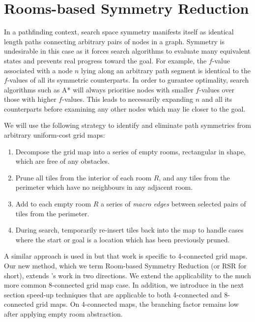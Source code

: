 \section{Rooms-based Symmetry Reduction}
In a pathfinding context, search space symmetry manifests itself as identical
length paths connecting arbitrary pairs of nodes in a graph. 
Symmetry is undesirable in this case as it forces search algorithms to evaluate 
many equivalent states and prevents real progress toward the goal.
For example, the $f$-value associated with a node $n$ lying along an arbitrary
 path segment is identical to the $f$-values of all its symmetric counterparts.
In order to gurantee optimality, search algorithms such as A* will always prioritise
nodes with smaller $f$-values over those with higher $f$-values. This leads to
necessarily expanding $n$ and all its counterparts before examining any other
nodes which may lie closer to the goal.
\par
We will use the following strategy to identify and eliminate path symmetries
from arbitrary uniform-cost grid maps: 
\begin{enumerate}
\item{Decompose the grid map into a series of empty rooms, rectangular in shape, which are free of any obstacles.}
\item{Prune all tiles from the interior of each room $R$, and any tiles from the
perimeter which have no neighbours in any adjacent room.} 
\item{Add to each empty room $R$ a series of \emph{macro edges} between 
selected pairs of tiles from the perimeter.}
\item{During search, temporarily re-insert tiles back into the map to handle cases where the
start or goal is a location which has been previously pruned.}
\end{enumerate}
A similar approach is used in \cite{harabor10} but that work is specific to
4-connected grid maps.
Our new method, which we term Room-based Symmetry Reduction (or RSR for short),
extends \citeauthor{harabor10}'s work in two directions.
We extend the applicability to the much more common 8-connected grid map case.
In addition, we introduce in the next section speed-up techniques that
are applicable to both 4-connected and 8-connected grid maps.
On 4-connected maps, the branching factor remains low after applying empty room abstraction.
